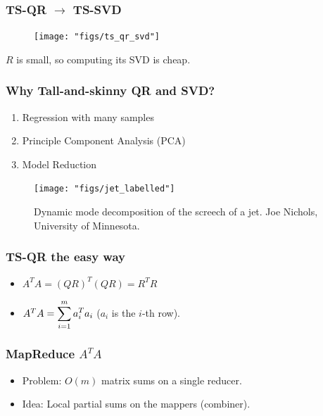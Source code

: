 \documentclass{beamer}
\begin{document}
\begin{frame}
\frametitle{TS-QR $\rightarrow$ TS-SVD}

\begin{figure}[h!]
\centering
\texttt{[image: "figs/ts\_qr\_svd"]}
\end{figure}

\vspace{0.2in}

$R$ is small, so computing its SVD is cheap.
\end{frame}


\begin{frame}
\frametitle{Why Tall-and-skinny QR and SVD?}
\begin{enumerate}
\setlength{\itemsep}{0.05in}
\item{Regression with many samples}
\item{Principle Component Analysis (PCA)}
\item{Model Reduction}
\end{enumerate}

\begin{figure}[h!]
\centering
\texttt{[image: "figs/jet\_labelled"]}
\caption{Dynamic mode decomposition of the screech of a jet.
Joe Nichols, University of Minnesota.}
\end{figure}
\end{frame}

\begin{frame}
\frametitle{TS-QR the easy way}

\begin{itemize}
\item $A^TA = (QR)^T(QR) = R^TR$
\item $A^TA = \displaystyle\sum\limits_{i=1}^{m} a_i^Ta_i$ {\quad} ($a_i$ is the $i$-th row).
\end{itemize}

\lstset{numbers=left}

\end{frame}

\begin{frame}
\frametitle{MapReduce $A^TA$}

\begin{itemize}
\setlength{\itemsep}{0.1in}
\item \textcolor{problem}{Problem}: $O(m)$ matrix sums on a single reducer.
\item \textcolor{idea}{Idea}: Local partial sums on the mappers (combiner).
\end{itemize}

\lstset{numbers=left}

\end{frame}
\end{document}
